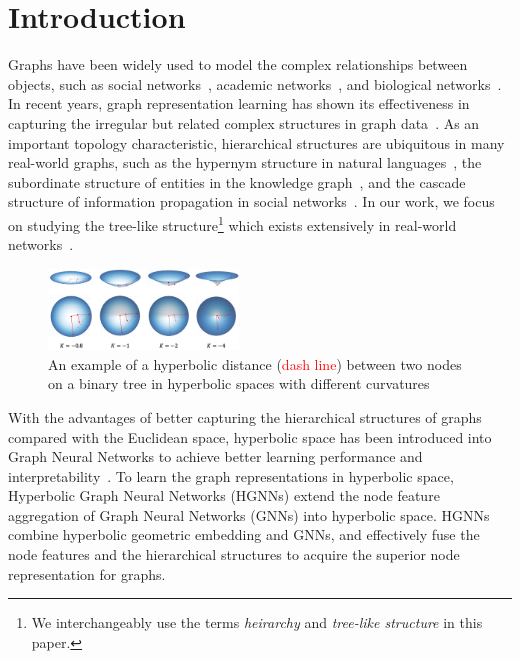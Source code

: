 \section{Introduction}
Graphs have been widely used to model the complex relationships between objects, such as social networks~\cite{hamilton2017inductive}, academic networks~\cite{getoor2005link}, and biological networks~\cite{gilmer2017neural}. 
In recent years, graph representation learning has shown its effectiveness in capturing the irregular but related complex structures in graph data~\cite{hamilton2017inductive}. 
As an important topology characteristic, hierarchical structures are ubiquitous in many real-world graphs, such as the hypernym structure in natural languages~\cite{NickelK17Poincare,PoincareGlove}, the subordinate structure of entities in the knowledge graph~\cite{balazevic2019multi,wang2020h2kgat}, and the cascade structure of information propagation in social networks~\cite{zubiaga2018detection}. 
In our work, we focus on studying the tree-like structure\footnote{We interchangeably use the terms \textit{heirarchy} and \textit{tree-like structure} in this paper. } which exists extensively in real-world networks~\cite{Krioukov2010Hyperbolic}. 


\begin{figure}[ht]
	\centering
	\includegraphics[width=0.45\textwidth]{figure/example_1.png}
	\caption{An example of a hyperbolic distance (\textcolor{red}{dash line}) between two nodes on a binary tree in hyperbolic spaces with different curvatures}
	\label{example_1}
\end{figure}

With the advantages of better capturing the hierarchical structures of graphs compared with the Euclidean space, hyperbolic space has been introduced into Graph Neural Networks to achieve better learning performance and interpretability~\cite{NickelK17Poincare}. 
To learn the graph representations in hyperbolic space, Hyperbolic Graph Neural Networks (HGNNs) extend the node feature aggregation of Graph Neural Networks (GNNs) into hyperbolic space. 
HGNNs combine hyperbolic geometric embedding and GNNs, and effectively fuse the node features and the hierarchical structures to acquire the superior node representation for graphs. 

